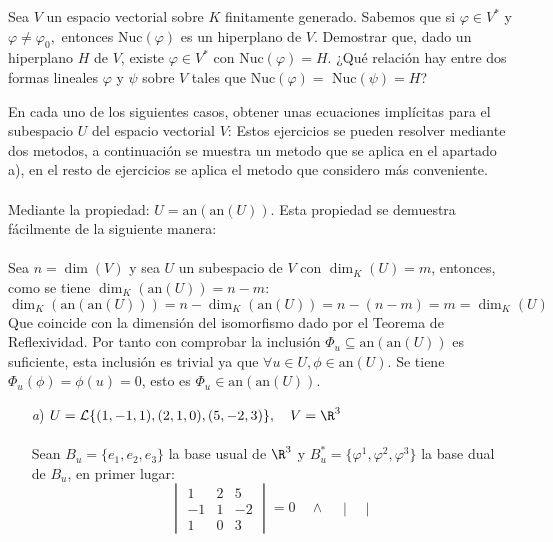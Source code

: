 \begin{ejercicio}
	Sea $V$ un espacio vectorial sobre $K$ finitamente generado. Sabemos que si $\varphi \in V^{*}$ y
	$\varphi \neq \varphi_0,$ entonces Nuc$(\varphi)$ es un hiperplano de $V$. Demostrar que, dado un hiperplano $H$ de $V$,
	existe $\varphi \in V^{*}$ con Nuc$(\varphi) = H$. ¿Qué relación hay entre dos formas lineales $\varphi$ y $\psi$ sobre $V$
	tales que Nuc$(\varphi) = $ Nuc$(\psi) = H$?
\end{ejercicio}

\begin{ejercicio}
	En cada uno de los siguientes casos, obtener unas ecuaciones implícitas para el subespacio $U$ del espacio vectorial
	$V$:
	Estos ejercicios se pueden resolver mediante dos metodos, a continuación se muestra un metodo que se aplica en el apartado a),
	en el resto de ejercicios se aplica el metodo que considero más conveniente. \\ \\
	Mediante la propiedad: $ U = \text{an}(\text{an}(U))$. Esta propiedad se demuestra fácilmente de la siguiente manera:
	\\ \\ Sea $n = \dim(V)$ y sea $U$ un subespacio de $V$ con $\dim_K (U) = m$, entonces, como se tiene $\dim_K(\text{an}(U)) = n-m$:
	\begin{equation*}
		\dim_K(\text{an}(\text{an}(U))) = n - \dim_K(\text{an}(U)) = n - (n-m) = m = \dim_K(U)
	\end{equation*}
	Que coincide con la dimensión del isomorfismo dado por el Teorema de Reflexividad. Por tanto con comprobar la inclusión
	$\Phi_u \subseteq \text{an}(\text{an}(U))$  es suficiente, esta inclusión es trivial ya que $\forall u \in U, \phi \in \text{an}(U)$.
	Se tiene $\Phi_u(\phi) = \phi(u)=0$, esto es $\Phi_u \in \text{an}(\text{an}(U))$.
	\begin{itemize}
		\item[\textit{a})] $U=\mathcal{L}\{(1,-1,1),(2,1,0),(5,-2,3)\}, \quad V=\R^3$ \\ \\
			Sean $B_u = \{ e_1,e_2,e_3\}$ la base usual de $\R^3$ y $B_u^* = \{ \varphi^1,\varphi^2,\varphi^3\}$ la base dual de $B_u$, en primer lugar:
			\begin{equation*}
				\begin{vmatrix}
					1  & 2 & 5  \\
					-1 & 1 & -2 \\
					1  & 0 & 3
				\end{vmatrix} = 0 \quad \land \quad \begin{vmatrix}

\end{vmatrix}
\end{equation*}
\end{itemize}
\end{ejercicio}
